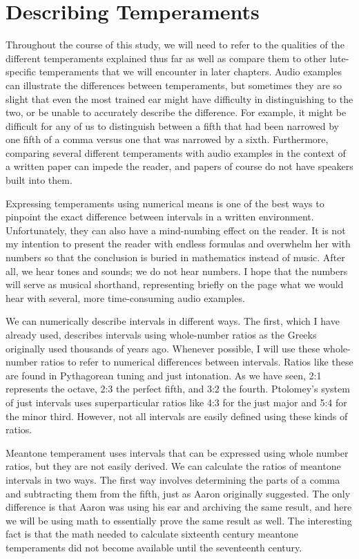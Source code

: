 \section{Describing Temperaments}

Throughout the course of this study, we will need to refer to the qualities of
the different temperaments explained thus far as well as compare them to other
lute-specific temperaments that we will encounter in later chapters.  Audio
examples can illustrate the differences between temperaments, but sometimes they
are so slight that even the most trained ear might have difficulty in
distinguishing to the two, or be unable to accurately describe the difference.
For example, it might be difficult for any of us to distinguish between a fifth
that had been narrowed by one fifth of a comma versus one that was narrowed by a
sixth.  Furthermore, comparing several different temperaments with audio
examples in the context of a written paper can impede the reader, and papers of
course do not have speakers built into them.

Expressing temperaments using numerical means is one of the best ways to
pinpoint the exact difference between intervals in a written
environment.  Unfortunately, they can also have a mind-numbing effect on the
reader.  It is not my intention to present the reader with endless formulas and
overwhelm her with numbers so that the conclusion is buried in mathematics
instead of music.  After all, we hear tones and sounds; we do not hear numbers.
I hope that the numbers will serve as musical shorthand, representing briefly
on the page what we would hear with several, more time-consuming
audio examples.

We can numerically describe intervals in different ways.  The first, which I have
already used, describes intervals using whole-number ratios as the Greeks originally
used thousands of years ago.  Whenever possible, I will use these whole-number ratios
to refer to numerical differences between intervals.  Ratios like these are found in Pythagorean
tuning and just intonation.  As we have seen, 2:1 represents the octave, 2:3 the perfect
fifth, and 3:2 the fourth.  Ptolomey's system of just intervals uses superparticular ratios like
4:3 for the just major and 5:4 for the minor third.  However, not all intervals are easily
defined using these kinds of ratios.

Meantone temperament uses intervals that can be expressed using whole number ratios, but
they are not easily derived.  We can calculate the ratios of meantone intervals in two ways.
The first way involves determining the parts of a comma and subtracting them from the fifth,
just as Aaron originally suggested.  The only difference is that Aaron was using his
ear and archiving the same result, and here we will be using math to essentially prove
the same result as well.  The interesting fact is that the math needed to calculate
sixteenth century meantone temperaments did not become available until the seventeenth
century.

